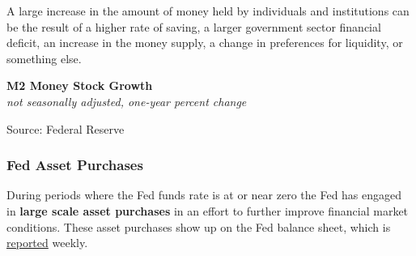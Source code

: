 \documentclass{report}
\makeatletter
\newcommand{\tbllink}[1]{\href{https://raw.githubusercontent.com/bdecon/US-chartbook/master/chartbook/data/#1}{\faTable}}
\newcommand*\short[1]{\expandafter\@gobbletwo\number\numexpr#1\relax}
\newcommand{\dateaxisticks}{
		date coordinates in=x, axis line style={draw=none},
		xmax={2023-02-15},
		max space between ticks=40,	    
		xtick={{1990-01-01}, {1992-01-01}, {1994-01-01}, 
			{1996-01-01}, {1998-01-01}, {2000-01-01}, 
			{2002-01-01}, {2004-01-01}, {2006-01-01},
			{2008-01-01}, {2010-01-01}, {2012-01-01}, {2014-01-01},
		    {2016-01-01}, {2018-01-01}, {2020-01-01}, {2022-01-01}, 
		    {2024-01-01}, {2026-01-01}},
		minor xtick={{1989-01-01}, {1991-01-01}, {1993-01-01},
			{1995-01-01}, {1997-01-01}, {1999-01-01}, 
			{2001-01-01}, {2003-01-01}, {2005-01-01}, {2007-01-01},
		    {2009-01-01}, {2011-01-01}, {2013-01-01}, {2015-01-01},
		    {2017-01-01}, {2019-01-01}, {2021-01-01}, {2023-01-01}, 
		    {2025-01-01}, {2027-01-01}},
		enlarge y limits={0.06}, enlarge x limits={0.01},
		}
\newcommand{\bbar}[2]{extra #1 ticks = {{#2}}, extra #1 tick labels = ,
		extra #1 tick style = {grid=major, grid style={thick, black!25}},}
\newcommand{\thickline}[4]{\addplot[ultra thick, no markers, color=#1] 
		table [x=#2, y=#3, col sep=comma] {#4};	}
\newcommand{\rbars}{
		\fill[color=black!10] (axis cs:{1990-07-01},\pgfkeysvalueof{/pgfplots/ymin}) rectangle 
			(axis cs:{1991-03-01}, \pgfkeysvalueof{/pgfplots/ymax});
		\fill[color=black!10] (axis cs:{2007-12-01},\pgfkeysvalueof{/pgfplots/ymin}) rectangle 
			(axis cs:{2009-07-01}, \pgfkeysvalueof{/pgfplots/ymax});
		\fill[color=black!10] (axis cs:{2001-03-01},\pgfkeysvalueof{/pgfplots/ymin}) rectangle 
			(axis cs:{2001-11-01}, \pgfkeysvalueof{/pgfplots/ymax});
		\fill[color=black!10] (axis cs:{2020-02-01},\pgfkeysvalueof{/pgfplots/ymin}) rectangle 
			(axis cs:{2020-05-01}, \pgfkeysvalueof{/pgfplots/ymax});}
\makeatother
\begin{document}
{\begin{minipage}{0.76\textwidth}
A large increase in the amount of money held by individuals and institutions can be the result of a higher rate of saving, a larger government sector financial deficit, an increase in the money supply, a change in preferences for liquidity, or something else.


\vspace{2mm}

\normalsize \textbf{M2 Money Stock Growth}\\
\footnotesize{\textit{not seasonally adjusted, one-year percent change}}
\vspace{3.2cm}

\hspace*{4mm} 

\footnotesize{Source: Federal Reserve} \hfill \tbllink{m2.csv}
\end{minipage}
\newpage
\begin{minipage}{0.76\textwidth}
\subsubsection*{Fed Asset Purchases}
\small During periods where the Fed funds rate is at or near zero the Fed has engaged in \textbf{large scale asset purchases} in an effort to further improve financial market conditions. These asset purchases show up on the Fed balance sheet, which is \href{https://www.federalreserve.gov/releases/h41/current/default.htm}{reported} weekly. 




\end{minipage}

}
\end{document}
